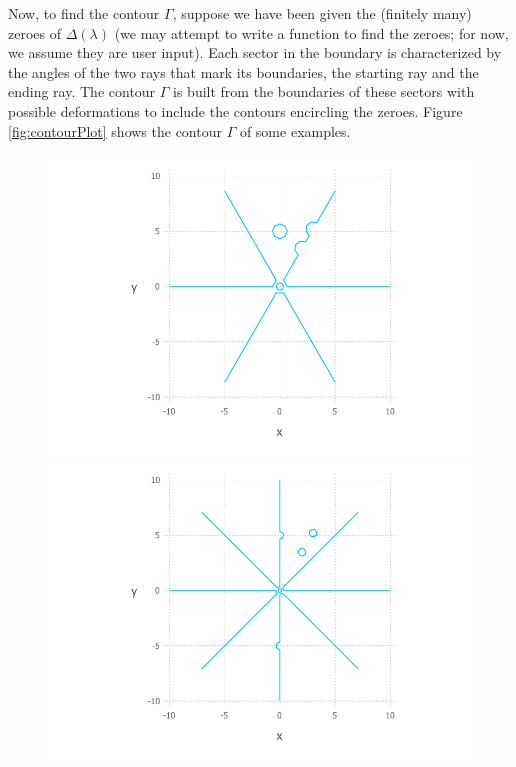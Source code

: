 \documentclass[11pt, oneside, a4paper]{article}
\begin{document}
Now, to find the contour $\Gamma$, suppose we have been given the (finitely many) zeroes of $\Delta(\lambda)$ (we may attempt to write a function to find the zeroes; for now, we assume they are user input). Each sector in the boundary is characterized by the angles of the two rays that mark its boundaries, the starting ray and the ending ray. The contour $\Gamma$ is built from the boundaries of these sectors with possible deformations to include the contours encircling the zeroes. Figure \ref{fig:contourPlot} shows the contour $\Gamma$ of some examples. 
\begin{figure}[htpb!]
      \includegraphics[width=\linewidth]{contourPlot1.pdf}
    \endminipage\hfill
      \includegraphics[width=\linewidth]{contourPlot2.pdf}
    \endminipage\hfill

\end{figure}
\end{document}
